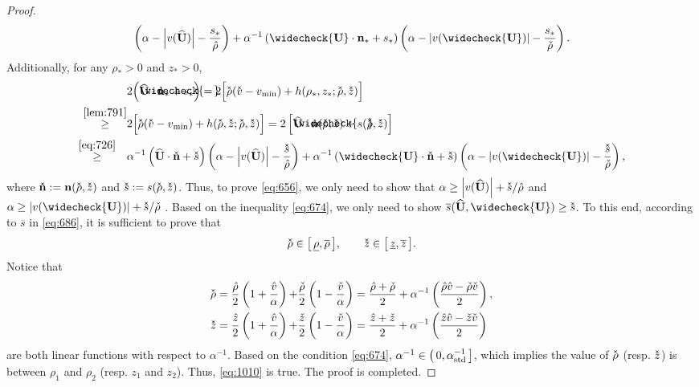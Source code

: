 \documentclass[times,final]{elsarticle}
\numberwithin{equation}{section}
\theoremstyle{definition}
\theoremstyle{remark}
\newcommand{\BU}{\mathbf{U}}
\newcommand{\hBU}{\widehat{\BU}}
\newcommand{\cBU}{\widecheck{\BU}}
\newcommand{\Bn}{\mathbf{n}}
\newcommand{\hcBU}{
	\mathrlap{
		\raisebox{0.6 pt}{$\widecheck{\phantom{\mathbf{U}}}$}
	}
	\mathrlap{
		\raisebox{-0.6 pt}{$\widehat{\phantom{\mathbf{U}}}$}
	}
	\mathbf{U}
}
\newcommand{\hcr}{
	\mathrlap{
		\raisebox{0.5 pt}{$\check{\phantom{\rho}}$}
	}
	\mathrlap{
		\raisebox{-0.5 pt}{$\hat{\phantom{\rho}}$}
	}
	\rho
}
\newcommand{\hcz}{
	\mathrlap{
		\raisebox{0.5 pt}{$\check{\phantom{z}}$}
	}
	\mathrlap{
		\raisebox{-0.5 pt}{$\hat{\phantom{z}}$}
	}
	z
}
\newcommand{\hcv}{
	\mathrlap{
		\raisebox{0.5 pt}{$\check{\phantom{v}}$}
	}
	\mathrlap{
		\raisebox{-0.5 pt}{$\hat{\phantom{v}}$}
	}
	v
}
\newcommand{\hcs}{
	\mathrlap{
		\raisebox{0.5 pt}{$\check{\phantom{s}}$}
	}
	\mathrlap{
		\raisebox{-0.5 pt}{$\hat{\phantom{s}}$}
	}
	s
}
\newcommand{\hcBn}{
	\mathrlap{
		\raisebox{0.5 pt}{$\check{\phantom{\Bn}}$}
	}
	\mathrlap{
		\raisebox{-0.5 pt}{$\hat{\phantom{\Bn}}$}
	}
	\Bn
}
\begin{document}
\begin{proof}
\begin{equation}
\begin{aligned}
			\left(\alpha-\left|v(\hBU)\right|-\frac{s_*}{\hat{\rho}}\right)
			+
			\alpha^{-1}
			\left(\cBU \cdot \Bn_*+s_*\right)
			\left(\alpha-\left|v(\cBU)\right|-\frac{s_*}{\check{\rho}}\right).
		\end{aligned}
	\end{equation}
	Additionally, for any $\rho_* > 0$ and $z_* > 0$,
	\begin{align*}
		& 2 \Big( \hcBU \cdot \Bn_* + s_* \Big)
		=
		2 \Big[
		\hcr (\hcv-v_{\min}) + h(\rho_*,z_*;\hcr,\hcz)
		\Big]
		\\
		\stackrel{\rm \Cref{lem:791}}{\ge} &
		2 \Big[
		\hcr (\hcv-v_{\min}) + h(\hcr,\hcz;\hcr, \hcz)
		\Big]
		=
		2 \left[\hcBU \cdot \Bn(\hcr,\hcz) + s (\hcr,\hcz) \right]
		\\
		\stackrel{\eqref{eq:726}}{\ge} \hspace{3.5mm}
		&
		\alpha^{-1}\left(\hBU\cdot\hcBn+\hcs\right)
		\left(\alpha-\left|v(\hBU)\right|-\frac{\hcs}{\hat{\rho}}\right)
		+
		\alpha^{-1}\left(\cBU\cdot\hcBn+\hcs\right)
		\left(\alpha-\left|v(\cBU)\right|-\frac{\hcs}{\check{\rho}}\right),
	\end{align*}
	where $\hcBn := \Bn(\hcr,\hcz)$ and $\hcs := s(\hcr,\hcz)$.
	Thus, to prove \eqref{eq:656}, we only need to show that
	$
	\alpha 	\ge \left|v(\hBU)\right|+{\hcs}/{\hat{\rho}}
	$ and $
	\alpha \ge \left|v(\cBU)\right|+{\hcs}/{\check{\rho}}
	$ .
	Based on the inequality \eqref{eq:674}, we only need to show $\overline{s}(\hBU,\cBU) \ge \hcs$.
	To this end, according to $\overline{s}$ in \eqref{eq:686}, it is sufficient to prove that
	\begin{equation}\label{eq:1010}
		\hcr \in \big[\,\underline{\rho},\overline{\rho}\,\big],
		\qquad
		\hcz \in \big[\,\underline{z},\overline{z}\,\big].
	\end{equation}
	Notice that 
	\begin{align*}
		\hcr
		=
		\frac{\hat{\rho}}{2}\left(1+\frac{\hat{v}}{\alpha}\right) 
		+&
		\frac{\check{\rho}}{2}\left(1-\frac{\check{v}}{\alpha}\right)
		=
		\frac{\hat{\rho}+\check{\rho}}{2}
		+
		\alpha^{-1} \left( \frac{\hat{\rho}\hat{v}-\check{\rho}\check{v}}{2} \right),
		\\
		\hcz
		=
		\frac{\hat{z}}{2}\left(1+\frac{\hat{v}}{\alpha}\right) 
		+&
		\frac{\check{z}}{2}\left(1-\frac{\check{v}}{\alpha}\right)
		=
		\frac{\hat{z}+\check{z}}{2}
		+
		\alpha^{-1} \left( \frac{\hat{z}\hat{v}-\check{z}\check{v}}{2} \right)
	\end{align*}
	are both linear functions with respect to $\alpha^{-1}$.
	Based on the condition \eqref{eq:674}, $\alpha^{-1} \in \big(\,0,\alpha_{\rm std}^{-1}\,\big]$, which implies the value of $\hcr$ (resp. $\hcz$) is between $\rho_1$ and $\rho_2$ (resp. $z_1$ and $z_2$). Thus,  \eqref{eq:1010} is true. The proof is completed.
\end{proof}
\end{document}
